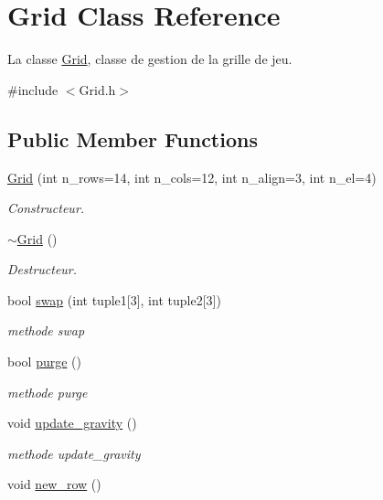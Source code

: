 \hypertarget{classGrid}{\section{Grid Class Reference}
\label{classGrid}
}


La classe \hyperlink{classGrid}{Grid}, classe de gestion de la grille de jeu.  




{\ttfamily \#include $<$Grid.\-h$>$}

\subsection*{Public Member Functions}
\begin{DoxyCompactItemize}
\item 
\hyperlink{classGrid_a039bc6a8c8a2e41983ad4cf1eab0364f}{Grid} (int n\-\_\-rows=14, int n\-\_\-cols=12, int n\-\_\-align=3, int n\-\_\-el=4)
\begin{DoxyCompactList}\small\item\em Constructeur. \end{DoxyCompactList}\item 
\hyperlink{classGrid_a3661d0a7f998caaaf8627d7a67072116}{$\sim$\-Grid} ()
\begin{DoxyCompactList}\small\item\em Destructeur. \end{DoxyCompactList}\item 
bool \hyperlink{classGrid_aa65d732ea572988673bee1d5d256c1b5}{swap} (int tuple1\mbox{[}3\mbox{]}, int tuple2\mbox{[}3\mbox{]})
\begin{DoxyCompactList}\small\item\em methode swap \end{DoxyCompactList}\item 
bool \hyperlink{classGrid_a37d9de7ca037dc55a216a77b24053792}{purge} ()
\begin{DoxyCompactList}\small\item\em methode purge \end{DoxyCompactList}\item 
void \hyperlink{classGrid_a2d358e4b15b15ba9c7f615af64b613e8}{update\-\_\-gravity} ()
\begin{DoxyCompactList}\small\item\em methode update\-\_\-gravity \end{DoxyCompactList}\item 
void \hyperlink{classGrid_af560c597438de04a741b8734e649d2a1}{new\-\_\-row} ()

\end{DoxyCompactItemize}
